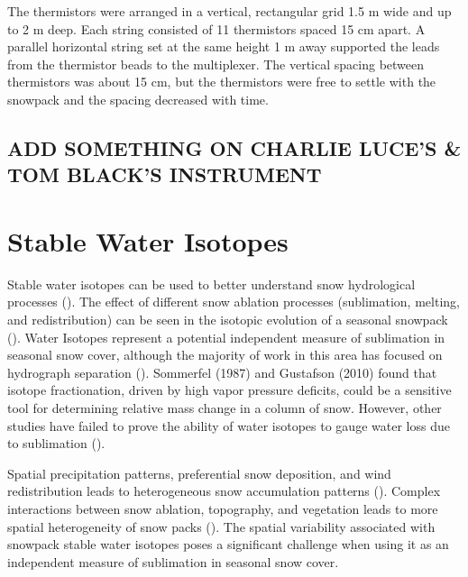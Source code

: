 The thermistors were arranged in a vertical, rectangular grid 1.5 m wide and up to 2 m deep. Each string consisted of 11 thermistors spaced 15 cm apart. A parallel horizontal string set at the same height 1 m away supported the leads from the thermistor beads to the multiplexer. The vertical spacing between thermistors was about 15 cm, but the thermistors were free to settle with the snowpack and the spacing decreased with time. 

\subsection{ADD SOMETHING ON CHARLIE LUCE'S & TOM BLACK'S INSTRUMENT} 

\section{Stable Water Isotopes} 
Stable water isotopes can be used to better understand snow hydrological processes (\cite{beria_larsen_ceperley_michelon_vennemann_schaefli_2017}). The effect of different snow ablation processes (sublimation, melting, and redistribution) can be seen in the isotopic evolution of a seasonal snowpack (\cite{beria_larsen_ceperley_michelon_vennemann_schaefli_2017}). Water Isotopes represent a potential independent measure of sublimation in seasonal snow cover, although the majority of work in this area has focused on hydrograph separation (\cite{gustafson2010estimating}). Sommerfel (1987) and Gustafson (2010) found that isotope fractionation, driven by high vapor pressure deficits, could be a sensitive tool for determining relative mass change in a column of snow. However, other studies have failed to prove the ability of water isotopes to gauge water loss due to sublimation (\cite{friedman1991isotopic}). 

Spatial precipitation patterns, preferential snow deposition, and wind redistribution leads to heterogeneous snow accumulation patterns (\cite{beria_larsen_ceperley_michelon_vennemann_schaefli_2017}). Complex interactions between snow ablation, topography, and vegetation leads to more spatial heterogeneity of snow packs (\cite{beria_larsen_ceperley_michelon_vennemann_schaefli_2017}). The spatial variability associated with snowpack stable water isotopes poses a significant challenge when using it as an independent measure of sublimation in seasonal snow cover. 